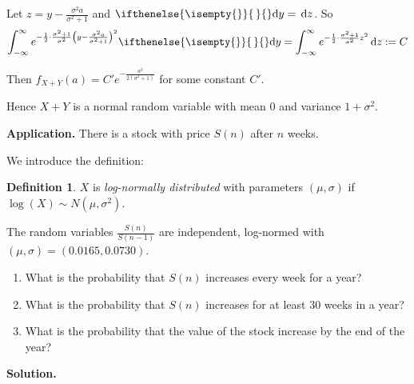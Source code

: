 \documentclass[a4paper,11pt]{amsbook}
\makeatletter
\renewenvironment{proof}[1][\proofname]{\par
    \pushQED{\qed}%
    \normalfont \topsep6\p@\@plus6\p@\relax
    \trivlist
    \itemindent\z@ %
    \item[\hskip\labelsep
          \scshape
      #1\@addpunct{.}]\ignorespaces
}{%
    \popQED\endtrivlist\@endpefalse
}
\theoremstyle{definition}
\newtheorem{definition}{\hspace{-2em} \color{darkblue} Definition}[chapter]
\theoremstyle{remark}
\newcommand\0{\varnothing}
\newcommand\dy[1][]{\ifthenelse{\isempty{#1}}{\,}{}\mathrm{d}y}
\newcommand\dt[1][t]{\,\mathrm{d}#1}
\makeatother
\begin{document}
\begin{proof}
        Let $z=y-\frac{\sigma^2a}{\sigma^2+1}$ and $\dy=\dt[z]$. So
        $$\int_{-\infty}^{\infty}e^{-\frac12\cdot\frac{\sigma^2+1}{\sigma^2}\left(y-\frac{\sigma^2a}{\sigma^2+1}\right)^2}\dy
        =\int_{-\infty}^{\infty}e^{-\frac12\cdot\frac{\sigma^2+1}{\sigma^2}z^2}\dt[z]:=C$$

        Then $f_{X+Y}(a)=C'e^{-\frac{a^2}{2(\sigma^2+1)}}$ for some constant $C'$.

        Hence $X+Y$ is a normal random variable with mean 0 and variance $1+\sigma^2$.
    \end{proof}

    \noindent \textbf{Application.} There is a stock with price $S(n)$ after $n$ weeks.

    We introduce the definition:
    \begin{definition}
        $X$ is \emph{log-normally distributed} with parameters $(\mu,\sigma)$ if $\log(X)\sim N(\mu,\sigma^2)$.
    \end{definition}
    The random variables $\frac{S(n)}{S(n-1)}$ are independent, log-normed with $(\mu,\sigma)=(0.0165,0.0730)$.
    \begin{enumerate}
        \item What is the probability that $S(n)$ increases every week for a year?
        \item What is the probability that $S(n)$ increases for at least 30 weeks in a year?
        \item What is the probability that the value of the stock increase by the end of the year?
    \end{enumerate}
    \textbf{Solution.}
\end{document}
